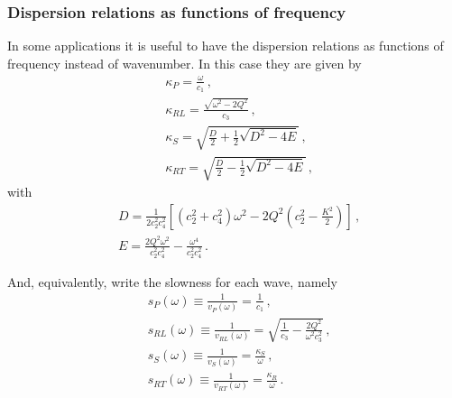 \documentclass[12pt]{article}
\begin{document}
\subsubsection{Dispersion relations as functions of frequency}
In some applications it is useful to have the dispersion relations as functions of frequency instead of wavenumber. In this case they are given by
\begin{align}
&\kappa_P = \frac{\omega}{c_1}\, ,\\
&\kappa_{RL} = \frac{\sqrt{\omega^2 - 2Q^2}}{c_3}\, ,\\
&\kappa_S = \sqrt{\frac{D}{2} + \frac{1}{2} \sqrt{D^2 - 4E}}\, ,\\
&\kappa_{RT} = \sqrt{\frac{D}{2} - \frac{1}{2} \sqrt{D^2 - 4E}}\, ,
\end{align}
with
\begin{align*}
&D = \frac{1}{2c_2^2 c_4^2}\left[(c_2^2 + c_4^2)\omega^2 - 2Q^2\left(c_2^2 - \frac{K^2}{2}\right)\right]\, ,\\
&E = \frac{2Q^2 \omega^2}{c_2^2 c_4^2} - \frac{\omega^4}{c_2^2 c_4^2}\, .
\end{align*}

And, equivalently, write the slowness for each wave, namely
\begin{align}
&s_P(\omega) \equiv \frac{1}{v_P(\omega)} = \frac{1}{c_1}\, ,\\
&s_{RL}(\omega) \equiv \frac{1}{v_{RL}(\omega)} = \sqrt{\frac{1}{c_3} - \frac{2Q^2}{\omega^2 c_3^2}}\, ,\\
&s_S(\omega)\equiv \frac{1}{v_S(\omega)} = \frac{\kappa_S}{\omega}\, ,\\
&s_{RT}(\omega) \equiv \frac{1}{v_{RT}(\omega)} = \frac{\kappa_R}{\omega}\, .
\end{align}
\end{document}
